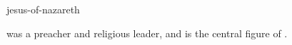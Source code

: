 \documentclass{stex}
\begin{document}
\begin{smodule}{jesus-of-nazareth}
\begin{sparagraph}[style=symdoc]
 was a  preacher and religious
leader, and is the central figure of .
\end{sparagraph}
\end{smodule}
\end{document}

